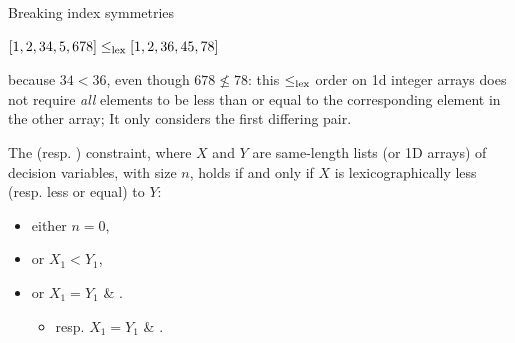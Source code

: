 \documentclass{cons-beamer}
\begin{document}
\begin{frame}{Breaking index symmetries}
  \begin{example}
    $[1,2,34,5,678] \leq_{\textnormal{lex}} [1,2,36,45,78]$

    because $34 < 36$, even though $678 \not\leq 78$: this $\leq_{\textnormal{lex}}$ order on 1d integer arrays does not require \textit{all} elements to be less than or equal to the corresponding element in the other array; It only considers the first differing pair.
  \end{example}

  \vfill

  \begin{definition}
    The  (resp. ) constraint, where $X$ and $Y$ are same-length lists (or 1D arrays) of decision variables, with size $n$, holds if and only if $X$ is lexicographically less (resp. less or equal) to $Y$:

    \begin{itemize}
      \item either $n = 0$,
      \item or $X_1 < Y_1$,
      \item or $X_1 = Y_1$ \& .
        \begin{itemize}
          \item resp. $X_1 = Y_1$ \& .
        \end{itemize}
    \end{itemize}
  \end{definition}
\end{frame}
\end{document}
